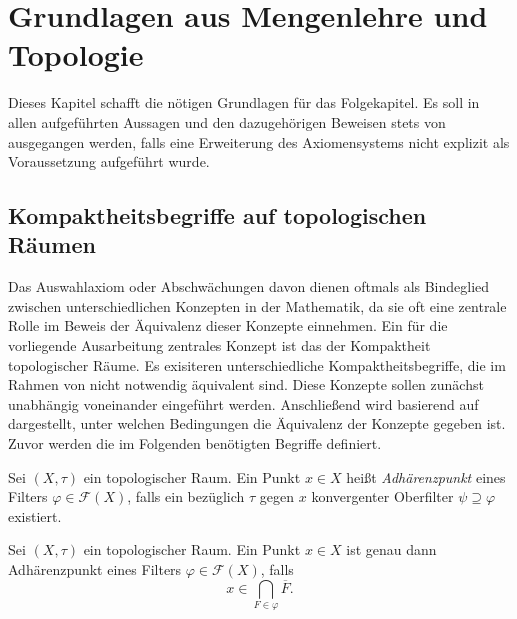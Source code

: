 \chapter{Grundlagen aus Mengenlehre und Topologie}

Dieses Kapitel schafft die nötigen Grundlagen für das Folgekapitel.
Es soll in allen aufgeführten Aussagen und den dazugehörigen Beweisen stets von \ZF ausgegangen werden, falls eine Erweiterung des Axiomensystems nicht explizit als Voraussetzung aufgeführt wurde.

\section{Kompaktheitsbegriffe auf topologischen Räumen}

Das Auswahlaxiom oder Abschwächungen davon dienen oftmals als Bindeglied zwischen unterschiedlichen Konzepten in der Mathematik, da sie oft eine zentrale Rolle im Beweis der Äquivalenz dieser Konzepte einnehmen. 
Ein für die vorliegende Ausarbeitung zentrales Konzept ist das der Kompaktheit topologischer Räume. 
Es exisiteren unterschiedliche Kompaktheitsbegriffe, die im Rahmen von \ZF nicht notwendig äquivalent sind.
Diese Konzepte sollen zunächst unabhängig voneinander eingeführt werden. 
Anschließend wird basierend auf \cite{herrlich2006axiom} dargestellt, unter welchen Bedingungen die Äquivalenz der Konzepte gegeben ist.
Zuvor werden die im Folgenden benötigten Begriffe definiert. 

\begin{defn}
  Sei $(X,\tau)$ ein topologischer Raum.
  Ein Punkt $x \in X$ heißt \textit{Adhärenzpunkt} eines Filters $\varphi \in \mathcal{F}(X)$, falls ein bezüglich $\tau$ gegen $x$ konvergenter Oberfilter $\psi \supseteq \varphi$ existiert.
\end{defn}

\begin{prop}
  \label{prop:adherence}
  Sei $(X,\tau)$ ein topologischer Raum.
  Ein Punkt $x \in X$ ist genau dann Adhärenzpunkt eines Filters $\varphi \in \mathcal{F}(X)$, falls
  \begin{displaymath}
    x \in \bigcap_{F \in \varphi} \overline{F}.
  \end{displaymath}
\end{prop}

